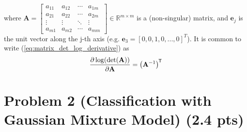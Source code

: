 \documentclass{article}
\newcommand{\real}{\mathbb{R}}
\newcommand*{\tran}{^{\mkern-1.5mu\mathsf{T}}}
\def\matA{{\mathbf A}}
\def\real{{\mathbb {R}}}
\begin{document}
\begin{enumerate}
\begin{equation}
    \end{equation}
    where $\boldsymbol{\matA} = \left[\begin{array}{cccc}
    a_{11} & a_{12} & \cdots & a_{1 m} \\
    a_{21} & a_{22} & \cdots & a_{2 m} \\
    \vdots & \vdots & \ddots & \vdots \\
    a_{m 1} & a_{m 2} & \cdots & a_{m m}
    \end{array}\right]
     \in \real^{m\times m}$ is a (non-singular) matrix, and $\mathbf{e}_j$ is the unit vector along the j-th axis (e.g. $\mathbf{e}_3=[0,0,1,0,...,0]^T$).
     It is common to write (\ref{eq:matrix_det_log_derivative}) as
     $$\frac{\partial \log(\det(\matA))}{\partial \matA} =  \left(\matA^{-1}\right)\tran$$
\end{enumerate}


\section*{Problem 2 (Classification with Gaussian Mixture Model) (2.4 pts)}
\end{document}
